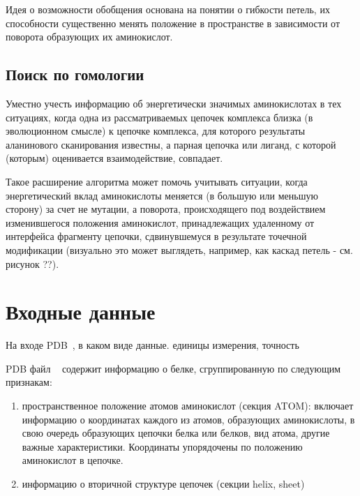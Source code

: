 Идея о возможности обобщения основана на понятии о гибкости петель, их способности существенно менять положение в пространстве в зависимости от поворота образующих их аминокислот.

\subsection{Поиск по гомологии}
Уместно учесть информацию об энергетически значимых аминокислотах в тех ситуациях, когда одна из рассматриваемых цепочек комплекса близка (в эволюционном смысле) к цепочке комплекса, для которого результаты аланинового сканирования известны, а парная цепочка или лиганд, с которой (которым) оценивается взаимодействие, совпадает.

Такое расширение алгоритма может помочь учитывать ситуации, когда энергетический вклад аминокислоты меняется (в большую или меньшую сторону) за счет не мутации, а поворота, происходящего под воздействием изменившегося положения аминокислот, принадлежащих удаленному от интерфейса фрагменту цепочки, сдвинувшемуся в результате точечной модификации (визуально это может выглядеть, например, как каскад петель - см. рисунок ??). 
\section{Входные данные}

На входе PDB~\cite{pdb}, в каком виде данные. единицы измерения, точность


PDB файл ~\cite{pdb} содержит информацию о белке, сгруппированную по следующим признакам: 
\begin{enumerate}
\item пространственное положение атомов аминокислот (секция ATOM):
включает информацию о координатах каждого из атомов, образующих аминокислоты, в свою очередь образующих цепочки белка или белков, вид атома, другие важные характеристики. Координаты упорядочены по положению аминокислот в цепочке.

\item информацию о вторичной структуре цепочек (секции helix, sheet)
\end{enumerate}


